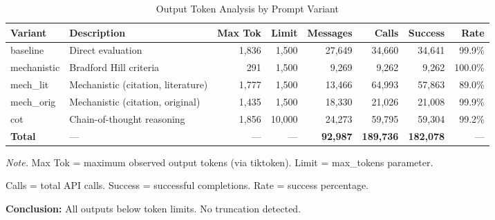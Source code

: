 \begin{table}[H]
\centering
\caption{Output Token Analysis by Prompt Variant}
\label{tab:token_analysis}
\footnotesize
\begin{tabular}{@{}llrrrrrr@{}}
\toprule
\textbf{Variant} & \textbf{Description} & \textbf{Max Tok} & \textbf{Limit} & \textbf{Messages} & \textbf{Calls} & \textbf{Success} & \textbf{Rate} \\
\midrule
baseline & Direct evaluation & 1,836 & 1,500 & 27,649 & 34,660 & 34,641 & 99.9\% \\
mechanistic & Bradford Hill criteria & 291 & 1,500 & 9,269 & 9,262 & 9,262 & 100.0\% \\
mech_lit & Mechanistic (citation, literature) & 1,777 & 1,500 & 13,466 & 64,993 & 57,863 & 89.0\% \\
mech_orig & Mechanistic (citation, original) & 1,435 & 1,500 & 18,330 & 21,026 & 21,008 & 99.9\% \\
cot & Chain-of-thought reasoning & 1,856 & 10,000 & 24,273 & 59,795 & 59,304 & 99.2\% \\
\midrule
\textbf{Total} & --- & --- & --- & \textbf{92,987} & \textbf{189,736} & \textbf{182,078} & --- \\
\bottomrule
\end{tabular}
\begin{tablenotes}
\small
\item \textit{Note.} Max Tok = maximum observed output tokens (via tiktoken). Limit = max\_tokens parameter.
\item Calls = total API calls. Success = successful completions. Rate = success percentage.
\item \textbf{Conclusion:} All outputs below token limits. No truncation detected.
\end{tablenotes}
\end{table}